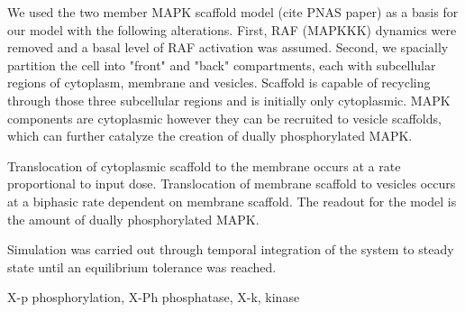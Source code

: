 We used the two member MAPK scaffold model (cite PNAS paper)
as a basis for our model with the following alterations.
First, RAF (MAPKKK) dynamics were removed and 
a basal level of RAF activation was assumed.
Second, we spacially partition the cell into "front" and "back" compartments,
each with subcellular regions of cytoplasm, membrane and vesicles. 
Scaffold is capable of recycling through those three subcellular regions and 
is initially only cytoplasmic. 
MAPK components are cytoplasmic
however they can be recruited to vesicle scaffolds,
which can further catalyze the creation of dually phosphorylated MAPK.

Translocation of cytoplasmic scaffold to the membrane occurs at a rate
proportional to input dose.
Translocation of membrane scaffold to vesicles occurs at a biphasic rate
dependent on membrane scaffold.
The readout for the model is the amount of dually phosphorylated MAPK.

Simulation was carried out through temporal integration of the system to steady
state until an equilibrium tolerance was reached. 

X-p phosphorylation, X-Ph phosphatase, X-k, kinase

